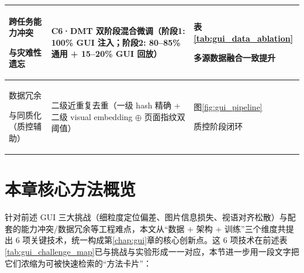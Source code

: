 \begin{table}[!htbp]
{\begin{tabular}{p{3.2cm}p{6.5cm}p{4.5cm}}
\midrule
跨任务能力冲突\par 与灾难性遗忘 &
C6·DMT 双阶段混合微调（阶段1: 100\% GUI 注入；阶段2: 80--85\% 通用 + 15--20\% GUI 回放） &
表\ref{tab:gui_data_ablation}\par 多源数据融合一致提升 \\
\midrule
数据冗余\par 与同质化（质控辅助） &
二级近重复去重（一级 hash 精确 + 二级 visual embedding $\oplus$ 页面指纹双阈值） &
图\ref{fig:gui_pipeline}\par 质控阶段闭环 \\
\bottomrule
\end{tabular}
}

\end{table}

\section{本章核心方法概览}
\label{sec:gui_method_overview}
针对前述 GUI 三大挑战（细粒度定位偏差、图片信息损失、视语对齐松散）与配套的能力冲突/数据冗余等工程难点，本文从“数据 + 架构 + 训练”三个维度共提出 6 项关键技术，统一构成第\ref{chap:gui}章的核心创新点。这 6 项技术在前述表\ref{tab:gui_challenge_map}已与挑战与实验形成一一对应，本节进一步用一段文字把它们浓缩为可被快速检索的“方法卡片”：

